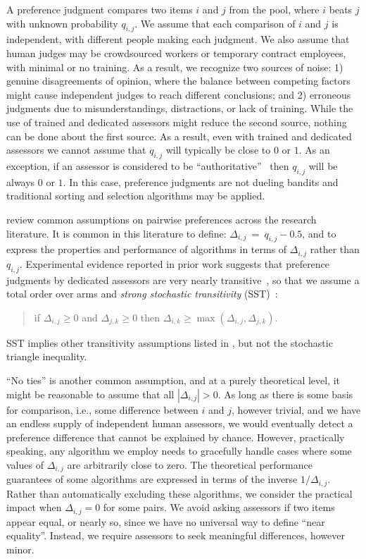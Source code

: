 A preference judgment compares two items $i$ and $j$ from the pool, where $i$ beats $j$ with unknown probability $q_{i,j}$. We assume that each comparison of $i$ and $j$ is independent, with different people making each judgment. We also assume that human judges may be crowdsourced workers or temporary contract employees, with minimal or no training.  As a result, we recognize two sources of noise: 1) genuine disagreements of opinion, where the balance between competing factors might cause independent judges to reach different conclusions; and 2) erroneous judgments due to misunderstandings, distractions, or lack of training. While the use of trained and dedicated assessors might reduce the second source, nothing can be done about the first source.  As a result, even with trained and dedicated assessors we cannot assume that $q_{i,j}$ will typically be close to $0$ or $1$. As an exception, if an assessor is considered to be ``authoritative''~\cite{ow13} then $q_{i,j}$ will be always $0$ or $1$. In this case,  preference judgments are not dueling bandits and traditional sorting and selection algorithms may be applied.

\citet{bbmh21} review common assumptions on pairwise preferences across the research literature. It is common in this literature to define: $\Delta_{i,j}~=~q_{i,j} - 0.5$, and to express the properties and performance of algorithms in terms of $\Delta_{i,j}$ rather than $q_{i,j}$. Experimental evidence reported in prior work suggests that preference judgments by dedicated assessors are very nearly transitive~\cite{cbcd08,sz20}, so that we assume a total order over arms and \emph{strong stochastic transitivity} (SST)~\cite{bbmh21}:

\begin{quote}
if  $\Delta_{i,j} \ge 0$ and $\Delta_{j,k} \ge 0$ then
$\Delta_{i,k} \ge \max\left(\Delta_{i,j}, \Delta_{j,k}\right)$.
\end{quote}

SST implies other transitivity assumptions listed in \citet{bbmh21}, but not the stochastic triangle inequality.

``No ties'' is another common assumption, and at a purely theoretical level, it might be reasonable to assume that all $|\Delta_{i,j}| > 0$. As long as there is some basis for comparison, i.e., some difference between $i$ and $j$, however trivial, and we have an endless supply of independent human assessors, we would eventually detect a preference difference that cannot be explained by chance. However, practically speaking, any algorithm we employ needs to gracefully handle cases where some values of $\Delta_{i,j}$ are arbitrarily close to zero. The theoretical performance guarantees of some algorithms are expressed in terms of the inverse $1/\Delta_{i,j}$. Rather than automatically excluding these algorithms, we consider the practical impact when $\Delta_{i,j} = 0$ for some pairs. We avoid asking assessors if two items appear equal, or nearly so, since we have no universal way to define ``near equality''. Instead, we require assessors to seek meaningful differences, however minor.

